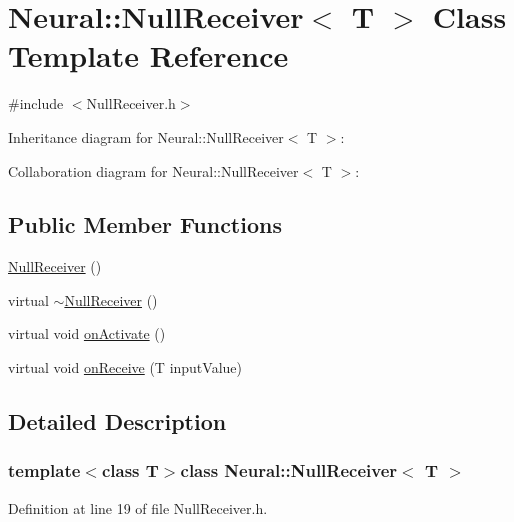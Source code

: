 \hypertarget{class_neural_1_1_null_receiver}{
\section{Neural::NullReceiver$<$ T $>$ Class Template Reference}
\label{class_neural_1_1_null_receiver}
}


{\ttfamily \#include $<$NullReceiver.h$>$}



Inheritance diagram for Neural::NullReceiver$<$ T $>$:


Collaboration diagram for Neural::NullReceiver$<$ T $>$:
\subsection*{Public Member Functions}
\begin{DoxyCompactItemize}
\item 
\hyperlink{class_neural_1_1_null_receiver_a8283757448b13b7f702837efe38c8418}{NullReceiver} ()
\item 
virtual \hyperlink{class_neural_1_1_null_receiver_a755ffe5f41106d156e4f4a7eccd8018d}{$\sim$NullReceiver} ()
\item 
virtual void \hyperlink{class_neural_1_1_null_receiver_a1baa5dee66e314ea723d70528381614b}{onActivate} ()
\item 
virtual void \hyperlink{class_neural_1_1_null_receiver_a69a5ae7e033eff1fca724ce6364ad807}{onReceive} (T inputValue)
\end{DoxyCompactItemize}


\subsection{Detailed Description}
\subsubsection*{template$<$class T$>$class Neural::NullReceiver$<$ T $>$}



Definition at line 19 of file NullReceiver.h.



